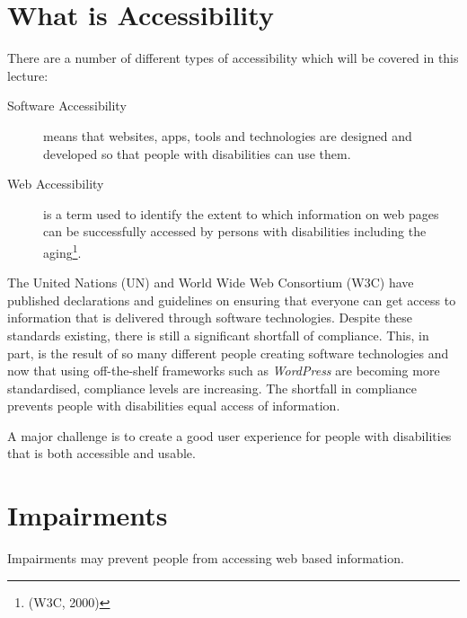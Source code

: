 
\section{What is Accessibility}
There are a number of different types of accessibility which will be covered in this lecture:
\begin{description}
    \item[Software Accessibility] means that websites, apps, tools and technologies are designed and developed so that people with disabilities can use them.
    \item[Web Accessibility] is a term used to identify the extent to which information on web pages can be successfully accessed by persons with disabilities including the aging\footnote{(W3C, 2000)}.
\end{description}

The United Nations (UN) and World Wide Web Consortium (W3C) have published declarations and guidelines on ensuring that everyone can get access to information that is delivered through software technologies. Despite these standards existing, there is still a significant shortfall of compliance. This, in part, is the result of so many different people creating software technologies and now that using off-the-shelf frameworks such as \textit{WordPress} are becoming more standardised, compliance levels are increasing. The shortfall in compliance prevents people with disabilities equal access of information. 

A major challenge is to create a good user experience for people with disabilities that is both accessible and usable.

\section{Impairments}
Impairments may prevent people from accessing web based information.


